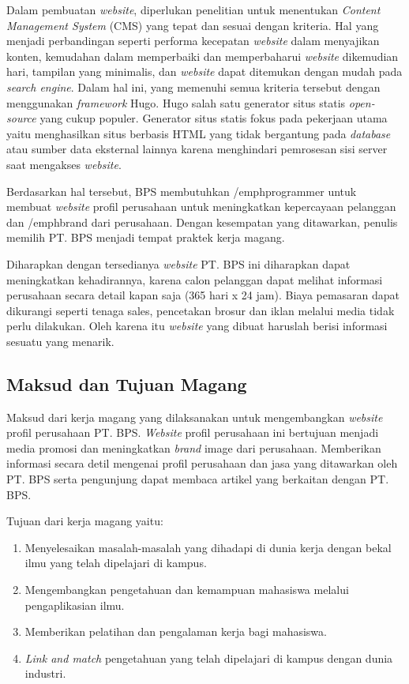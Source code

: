 Dalam pembuatan \emph{website}, diperlukan penelitian untuk menentukan \emph{Content Management System} (CMS) 
yang tepat dan sesuai dengan kriteria. Hal yang menjadi perbandingan seperti performa kecepatan \emph{website} 
dalam menyajikan konten, kemudahan dalam memperbaiki dan memperbaharui \emph{website} dikemudian hari, 
tampilan yang minimalis, dan \emph{website} dapat ditemukan dengan mudah pada \emph{search engine}. 
Dalam hal ini, yang memenuhi semua kriteria tersebut dengan menggunakan \emph{framework} Hugo. 
Hugo salah satu generator situs statis \emph{open-source} yang cukup populer.  
Generator situs statis fokus pada pekerjaan utama yaitu menghasilkan situs berbasis HTML
yang tidak bergantung pada \emph{database} atau sumber data eksternal lainnya karena menghindari 
pemrosesan sisi server saat mengakses \emph{website}.


Berdasarkan hal tersebut, BPS membutuhkan /emph{programmer} 
untuk membuat \emph{website} profil perusahaan 
untuk meningkatkan kepercayaan pelanggan dan /emph{brand} dari perusahaan. 
Dengan kesempatan yang ditawarkan, penulis memilih PT. BPS menjadi tempat praktek kerja magang.

Diharapkan dengan tersedianya \emph{website} PT. BPS ini 
diharapkan dapat meningkatkan kehadirannya, 
karena calon pelanggan dapat melihat informasi perusahaan secara detail kapan saja (365 hari x 24 jam). 
Biaya pemasaran dapat dikurangi seperti tenaga sales, 
pencetakan brosur dan iklan melalui media tidak perlu dilakukan. 
Oleh karena itu \emph{website} yang dibuat haruslah berisi informasi sesuatu yang menarik.

\subsection{Maksud dan Tujuan Magang}

Maksud dari kerja magang yang dilaksanakan untuk 
mengembangkan \emph{website} profil perusahaan 
PT. BPS. \emph{Website} profil perusahaan ini bertujuan menjadi media promosi dan meningkatkan \emph{brand}
image dari perusahaan. Memberikan informasi secara detil 
mengenai profil perusahaan dan jasa yang ditawarkan oleh PT. BPS serta 
pengunjung dapat membaca artikel yang berkaitan dengan PT. BPS.

\noindent Tujuan dari kerja magang yaitu:

\begin{enumerate}
\item Menyelesaikan masalah-masalah yang dihadapi di dunia kerja dengan bekal ilmu yang telah dipelajari di kampus.
\item Mengembangkan pengetahuan dan kemampuan mahasiswa melalui pengaplikasian ilmu.
\item Memberikan pelatihan dan pengalaman kerja bagi mahasiswa.
\item \emph{Link and match} pengetahuan yang telah dipelajari di kampus dengan dunia industri.
\end{enumerate}

